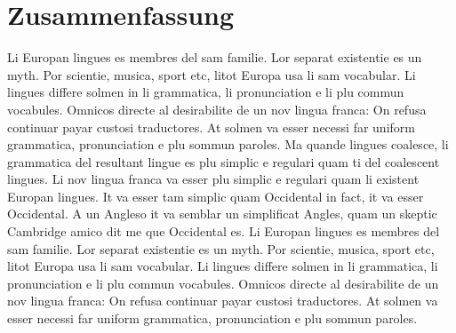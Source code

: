 \clearpage
\section*{Zusammenfassung}

Li Europan lingues es membres del sam familie. Lor separat existentie es un 
myth. Por scientie, musica, sport etc, litot Europa usa li sam vocabular. Li 
lingues differe solmen in li grammatica, li pronunciation e li plu commun 
vocabules. Omnicos directe al desirabilite de un nov lingua franca: On refusa 
continuar payar custosi traductores. At solmen va esser necessi far uniform 
grammatica, pronunciation e plu sommun paroles. Ma quande lingues coalesce, li 
grammatica del resultant lingue es plu simplic e regulari quam ti del coalescent 
lingues. Li nov lingua franca va esser plu simplic e regulari quam li existent 
Europan lingues. It va esser tam simplic quam Occidental in fact, it va esser 
Occidental. A un Angleso it va semblar un simplificat Angles, quam un skeptic 
Cambridge amico dit me que Occidental es. Li Europan lingues es membres del sam 
familie. Lor separat existentie es un myth. Por scientie, musica, sport etc, 
litot Europa usa li sam vocabular. Li lingues differe solmen in li grammatica, 
li pronunciation e li plu commun vocabules. Omnicos directe al desirabilite de 
un nov lingua franca: On refusa continuar payar custosi traductores. At solmen 
va esser necessi far uniform grammatica, pronunciation e plu sommun paroles. 

 
